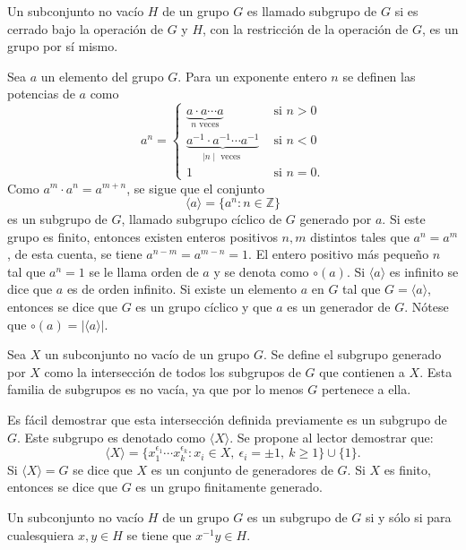 \begin{definicion}
Un subconjunto no vacío $H$ de un grupo $G$ es llamado subgrupo de $G$ si es cerrado bajo la operación de $G$ y $H$, con la restricción de la operación de $G$, es un grupo por sí mismo.
\end{definicion}
\begin{ejemplo}
Sea $a$ un elemento del grupo $G$. Para un exponente entero $n$ se definen las potencias de $a$ como
\[ a^n = \left\{ \begin{array}{lr}
\underset{n\mbox{ veces}}{\underbrace{a \cdot a \cdots a}} & \mbox{ si } n >0\\
\underset{\mid n \mid \mbox{ veces }}{\underbrace{a^{-1}\cdot a^{-1}\cdots a^{-1}}} & \mbox{ si } n<0 \\
1 & \mbox{ si } n = 0.
\end{array} \right.  \]
Como $a^m \cdot a^n = a^{m+n}$, se sigue que el conjunto
\[\langle a \rangle = \{ a^n : n \in \mathds{Z} \} \]
es un subgrupo de $G$, llamado subgrupo cíclico de $G$ generado por $a$.
Si este grupo es finito, entonces existen enteros positivos $n,m$ distintos tales que $a^n = a^m$, de esta cuenta, se tiene $a^{n-m} = a^{m-n} = 1$. El entero positivo más pequeño $n$  tal que $a^n = 1$ se le llama orden de $a$ y se denota como $\circ(a)$. Si $\langle a \rangle$ es infinito se dice que $a$ es de orden infinito.
Si existe un elemento $a$ en $G$ tal que $G = \langle a \rangle$, entonces se dice que $G$ es un grupo cíclico y que $a$ es un generador de $G$. Nótese que $\circ(a) = | \langle a \rangle | $.
\end{ejemplo}
\begin{ejemplo}
Sea $X$ un subconjunto no vacío de un grupo $G$. Se define el subgrupo generado por $X$ como la intersección de todos los subgrupos de $G$ que contienen a $X$. Esta familia de subgrupos es no vacía, ya que por lo menos $G$ pertenece a ella. 

Es fácil demostrar que esta intersección definida previamente es un subgrupo de $G$. Este subgrupo es denotado como $\langle X \rangle$. Se propone al lector demostrar que: 
\[ \langle X \rangle = \{ x_1^{\epsilon_1} \cdots x_k^{\epsilon_k} \colon x_i \in X, \ \epsilon_i = \pm 1, \ k \geq 1 \} \cup \{1\} .\]
Si $\langle X \rangle = G$ se dice que $X$ es un conjunto de generadores de $G$. Si $X$ es finito, entonces se dice que $G$ es un grupo finitamente generado.
\end{ejemplo}
 \begin{lema}
 Un subconjunto no vacío $H$ de un grupo $G$ es un subgrupo de $G$ si y sólo si para cualesquiera $x,y \in H$ se tiene que $x^{-1}y \in H$.
 \end{lema}
